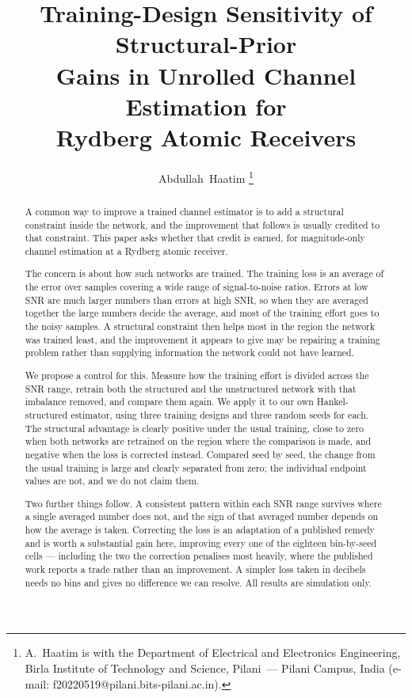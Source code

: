 \documentclass[journal]{IEEEtran}
\begin{document}
\title{Training-Design Sensitivity of Structural-Prior\\
Gains in Unrolled Channel Estimation for\\
Rydberg Atomic Receivers}

\author{Abdullah~Haatim%
\thanks{A.~Haatim is with the Department of Electrical and Electronics
Engineering, Birla Institute of Technology and Science, Pilani~--- Pilani
Campus, India (e-mail: f20220519@pilani.bits-pilani.ac.in).}}

\maketitle

\begin{abstract}
A common way to improve a trained channel estimator is to add a structural
constraint inside the network, and the improvement that follows is usually
credited to that constraint. This paper asks whether that credit is earned, for
magnitude-only channel estimation at a Rydberg atomic receiver.

The concern is about how such networks are trained. The training loss is an
average of the error over samples covering a wide range of signal-to-noise
ratios. Errors at low SNR are much larger numbers than errors at high SNR, so
when they are averaged together the large numbers decide the average, and most
of the training effort goes to the noisy samples. A structural constraint then
helps most in the region the network was trained least, and the improvement it
appears to give may be repairing a training problem rather than supplying
information the network could not have learned.

We propose a control for this. Measure how the training effort is divided
across the SNR range, retrain both the structured and the unstructured network
with that imbalance removed, and compare them again. We apply it to our own
Hankel-structured estimator, using three training designs and three random
seeds for each. The structural advantage is clearly positive under the usual
training, close to zero when both networks are retrained on the region where
the comparison is made, and negative when the loss is corrected instead.
Compared seed by seed, the change from the usual training is large and clearly
separated from zero; the individual endpoint values are not, and we do not
claim them.

Two further things follow. A consistent pattern within each SNR range survives
where a single averaged number does not, and the sign of that averaged number
depends on how the average is taken. Correcting the loss is an adaptation of a
published remedy and is worth a substantial gain here, improving every one of
the eighteen bin-by-seed cells --- including the two the correction penalises
most heavily, where the published work reports a trade rather than an
improvement. A simpler loss taken in decibels needs no bins and gives no
difference we can resolve. All results are simulation only.
\end{abstract}
\end{document}
